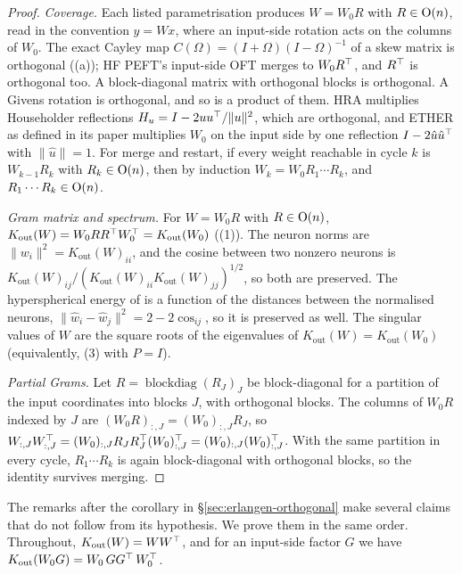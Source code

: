 \begin{proof}
\emph{Coverage.} Each listed parametrisation produces $W=W_0R$ with $R\in\mathrm{O}(n)$, read in the convention $y=Wx$, where an
input-side rotation acts on the columns of $W_0$. The exact Cayley map $C(\Omega)=(I+\Omega)(I-\Omega)^{-1}$ of a skew
matrix is orthogonal ((a)); HF PEFT's input-side OFT merges to $W_0R^{\top}$, and $R^{\top}$ is orthogonal too. A
block-diagonal matrix with orthogonal blocks is orthogonal. A Givens rotation is orthogonal, and so is a product of them.
HRA multiplies Householder reflections $H_u=I-2uu^{\top}/\lVert u\rVert^2$, which are orthogonal, and ETHER as defined in its
paper multiplies $W_0$ on the input side by one reflection $I-2\hat u\hat u^{\top}$ with $\lVert\hat u\rVert=1$. For merge and
restart, if every weight reachable in cycle $k$ is $W_{k-1}R_k$ with $R_k\in\mathrm{O}(n)$, then by induction
$W_k=W_0R_1\cdots R_k$, and $R_1\cdots R_k\in\mathrm{O}(n)$.

\emph{Gram matrix and spectrum.} For $W=W_0R$ with $R\in\mathrm{O}(n)$, $K_{\mathrm{out}}(W)=W_0RR^{\top} W_0^{\top}=K_{\mathrm{out}}(W_0)$
((1)). The neuron norms are $\lVert w_i\rVert^2=K_{\mathrm{out}}(W)_{ii}$, and the cosine between two
nonzero neurons is $K_{\mathrm{out}}(W)_{ij}/(K_{\mathrm{out}}(W)_{ii}K_{\mathrm{out}}(W)_{jj})^{1/2}$, so both are
preserved. The hyperspherical energy of \citet{liu2018learning} is a function of the distances between the normalised
neurons, $\lVert\hat w_i-\hat w_j\rVert^2=2-2\cos_{ij}$, so it is preserved as well. The singular values of $W$ are the
square roots of the eigenvalues of $K_{\mathrm{out}}(W)=K_{\mathrm{out}}(W_0)$ (equivalently, (3)
with $P=I$).

\emph{Partial Grams.} Let $R=\operatorname{blockdiag}(R_J)_J$ be block-diagonal for a partition of the input coordinates
into blocks $J$, with orthogonal blocks. The columns of $W_0R$ indexed by $J$ are $(W_0R)_{:,J}=(W_0)_{:,J}R_J$, so
$W_{:,J}W_{:,J}^{\top}=(W_0)_{:,J}R_JR_J^{\top}(W_0)_{:,J}^{\top}=(W_0)_{:,J}(W_0)_{:,J}^{\top}$. With the same partition in
every cycle, $R_1\cdots R_k$ is again block-diagonal with orthogonal blocks, so the identity survives merging.
\end{proof}

The remarks after the corollary in \S\ref{sec:erlangen-orthogonal} make several claims that do not follow from its
hypothesis. We prove them in the same order. Throughout, $K_{\mathrm{out}}(W)=WW^{\top}$, and for an input-side factor $G$ we have
$K_{\mathrm{out}}(W_0G)=W_0\,GG^{\top}\,W_0^{\top}$.

